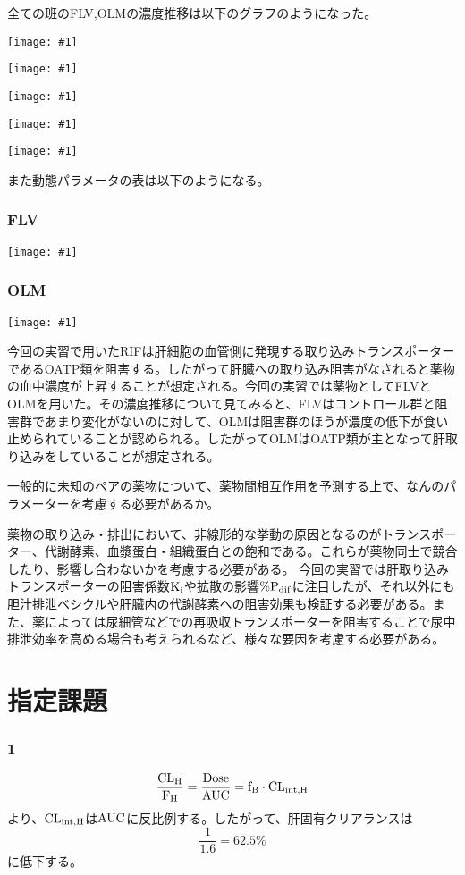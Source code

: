 \documentclass[a4paper,papersize,dvipdfmx]{jsarticle}
\newcommand{\pict}[2]{\begin{center} \texttt{[image: \#1]} \end{center}}   %
\begin{document}
全ての班のFLV,OLMの濃度推移は以下のグラフのようになった。

\pict{imgs/c-f.png}{6}
\pict{imgs/c-o.png}{6}
\pict{imgs/s-f.png}{6}
\pict{imgs/s-o.png}{6}
\pict{imgs/g-rif.png}{8}

また動態パラメータの表は以下のようになる。
\subsubsection*{FLV}
\pict{imgs/flv-t.png}{12}
\subsubsection*{OLM}
\pict{imgs/olm-t.png}{12}

今回の実習で用いたRIFは肝細胞の血管側に発現する取り込みトランスポーターであるOATP類を阻害する。したがって肝臓への取り込み阻害がなされると薬物の血中濃度が上昇することが想定される。今回の実習では薬物としてFLVとOLMを用いた。その濃度推移について見てみると、FLVはコントロール群と阻害群であまり変化がないのに対して、OLMは阻害群のほうが濃度の低下が食い止められていることが認められる。したがってOLMはOATP類が主となって肝取り込みをしていることが想定される。



\begin{tcolorbox}[colback=white,colbacktitle=black!10!white,coltitle=black]
一般的に未知のペアの薬物について、薬物間相互作用を予測する上で、なんのパラメーターを考慮する必要があるか。
\end{tcolorbox}

薬物の取り込み・排出において、非線形的な挙動の原因となるのがトランスポーター、代謝酵素、血漿蛋白・組織蛋白との飽和である。これらが薬物同士で競合したり、影響し合わないかを考慮する必要がある。
今回の実習では肝取り込みトランスポーターの阻害係数$\rm K_i$や拡散の影響$\rm \%P_{dif}$に注目したが、それ以外にも胆汁排泄ベシクルや肝臓内の代謝酵素への阻害効果も検証する必要がある。また、薬によっては尿細管などでの再吸収トランスポーターを阻害することで尿中排泄効率を高める場合も考えられるなど、様々な要因を考慮する必要がある。



\newpage
\section*{指定課題}
\small

\subsubsection*{1}
\[\rm \frac{CL_H}{F_H} = \frac{Dose}{AUC} = f_B \cdot CL_{int,H}\]
より、$\rm CL_{int,H}$は$\rm AUC$に反比例する。したがって、肝固有クリアランスは
\[\frac{1}{1.6} = 62.5 \%\]
に低下する。
\end{document}
